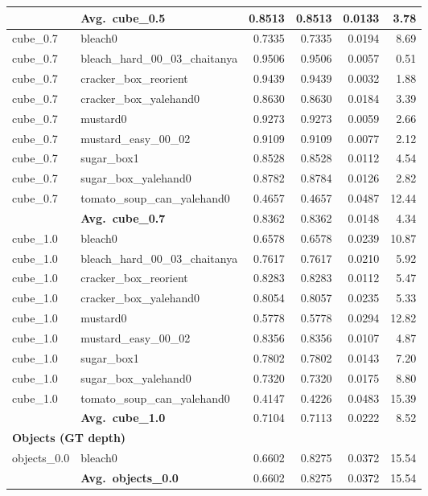 \begin{longtable}{llrrrr}
  & \textbf{Avg.~cube_0.5} & 0.8513 & 0.8513 & 0.0133 & 3.78 \\
  \midrule
  cube_0.7 & bleach0 & 0.7335 & 0.7335 & 0.0194 & 8.69 \\
  cube_0.7 & bleach\_hard\_00\_03\_chaitanya & 0.9506 & 0.9506 & 0.0057 & 0.51 \\
  cube_0.7 & cracker\_box\_reorient & 0.9439 & 0.9439 & 0.0032 & 1.88 \\
  cube_0.7 & cracker\_box\_yalehand0 & 0.8630 & 0.8630 & 0.0184 & 3.39 \\
  cube_0.7 & mustard0 & 0.9273 & 0.9273 & 0.0059 & 2.66 \\
  cube_0.7 & mustard\_easy\_00\_02 & 0.9109 & 0.9109 & 0.0077 & 2.12 \\
  cube_0.7 & sugar\_box1 & 0.8528 & 0.8528 & 0.0112 & 4.54 \\
  cube_0.7 & sugar\_box\_yalehand0 & 0.8782 & 0.8784 & 0.0126 & 2.82 \\
  cube_0.7 & tomato\_soup\_can\_yalehand0 & 0.4657 & 0.4657 & 0.0487 & 12.44 \\
  \cmidrule{2-6}
  & \textbf{Avg.~cube_0.7} & 0.8362 & 0.8362 & 0.0148 & 4.34 \\
  \midrule
  cube_1.0 & bleach0 & 0.6578 & 0.6578 & 0.0239 & 10.87 \\
  cube_1.0 & bleach\_hard\_00\_03\_chaitanya & 0.7617 & 0.7617 & 0.0210 & 5.92 \\
  cube_1.0 & cracker\_box\_reorient & 0.8283 & 0.8283 & 0.0112 & 5.47 \\
  cube_1.0 & cracker\_box\_yalehand0 & 0.8054 & 0.8057 & 0.0235 & 5.33 \\
  cube_1.0 & mustard0 & 0.5778 & 0.5778 & 0.0294 & 12.82 \\
  cube_1.0 & mustard\_easy\_00\_02 & 0.8356 & 0.8356 & 0.0107 & 4.87 \\
  cube_1.0 & sugar\_box1 & 0.7802 & 0.7802 & 0.0143 & 7.20 \\
  cube_1.0 & sugar\_box\_yalehand0 & 0.7320 & 0.7320 & 0.0175 & 8.80 \\
  cube_1.0 & tomato\_soup\_can\_yalehand0 & 0.4147 & 0.4226 & 0.0483 & 15.39 \\
  \cmidrule{2-6}
  & \textbf{Avg.~cube_1.0} & 0.7104 & 0.7113 & 0.0222 & 8.52 \\
  \midrule
\multicolumn{6}{l}{\textbf{Objects (GT depth)}} \\
\midrule
  objects_0.0 & bleach0 & 0.6602 & 0.8275 & 0.0372 & 15.54 \\
  \cmidrule{2-6}
  & \textbf{Avg.~objects_0.0} & 0.6602 & 0.8275 & 0.0372 & 15.54 \\
  \midrule
\bottomrule
\end{longtable}